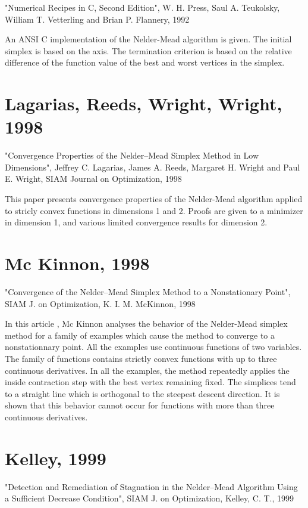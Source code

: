 "Numerical Recipes in C, Second Edition", 
W. H. Press, Saul A. Teukolsky, William T. Vetterling and Brian P. Flannery, 
1992

An ANSI C implementation of the Nelder-Mead algorithm is given.
The initial simplex is based on the axis. 
The termination criterion is based on the relative difference of the 
function value of the best and worst vertices in the simplex.

\section{Lagarias, Reeds, Wright, Wright, 1998}

"Convergence Properties of the Nelder--Mead Simplex Method in Low Dimensions", 
Jeffrey C. Lagarias, James A. Reeds, Margaret H. Wright and Paul E. Wright, 
SIAM Journal on Optimization, 1998

This paper \cite{lagarias:112} presents convergence properties of the Nelder-Mead algorithm applied
to stricly convex functions in dimensions 1 and 2. Proofs are given to a minimizer
in dimension 1, and various limited convergence results for dimension 2. 

\section{Mc Kinnon, 1998}

"Convergence of the Nelder--Mead Simplex Method to a Nonstationary Point", 
SIAM J. on Optimization, K. I. M. McKinnon, 1998

In this article \cite{589109}, Mc Kinnon analyses the behavior of the 
Nelder-Mead simplex method for a family of examples which cause the 
method to converge to a nonstationnary point. All the examples use 
continuous functions of two variables. The family of functions contains
strictly convex functions with up to three continuous derivatives.
In all the examples, the method repeatedly applies the inside 
contraction step with the best vertex remaining fixed. The simplices
tend to a straight line which is orthogonal to the steepest descent 
direction. It is shown that this behavior cannot occur for functions
with more than three continuous derivatives.

\section{Kelley, 1999}

"Detection and Remediation of Stagnation in the Nelder--Mead Algorithm Using a Sufficient Decrease Condition", 
SIAM J. on Optimization, Kelley, C. T., 1999

